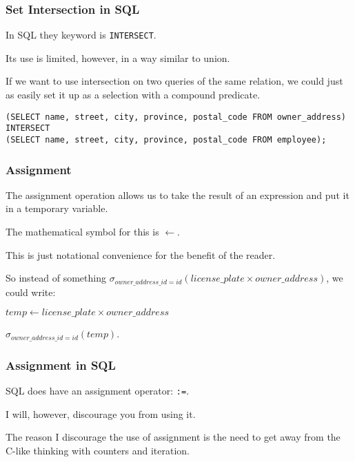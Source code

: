 \begin{frame}
\frametitle{Set Intersection in SQL}

In SQL they keyword is \texttt{INTERSECT}. 

Its use is limited, however, in a way similar to union. 

If we want to use intersection on two queries of the same relation, we could just as easily set it up as a selection with a compound predicate.

\texttt{(SELECT name, street, city, province, postal\_code FROM owner\_address)\\ 
INTERSECT\\ 
(SELECT name, street, city, province, postal\_code FROM employee);}


\end{frame}




\begin{frame}
\frametitle{Assignment}

The \alert{assignment} operation allows us to take the result of an expression and put it in a temporary variable. 

The mathematical symbol for this is $\leftarrow$.

This is just notational convenience for the benefit of the reader. 

So instead of something $\sigma_{owner\_address\_id = id}( license\_plate \times owner\_address )$, we could write: 

$temp \leftarrow license\_plate \times owner\_address$


$\sigma_{owner\_address\_id = id}( temp ) $.



\end{frame}



\begin{frame}
\frametitle{Assignment in SQL}

SQL does have an assignment operator: \texttt{:=}. 

I will, however, discourage you from using it.

The reason I discourage the use of assignment is the need to get away from the C-like thinking with counters and iteration.


\end{frame}




